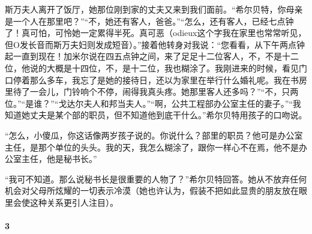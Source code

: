 \par 斯万夫人离开了饭厅，她那位刚到家的丈夫又来到我们面前。“希尔贝特，你母亲是一个人在那里吧？”“不，她还有客人，爸爸。”“怎么，还有客人，已经七点钟了！真可怕，可怜她一定累得半死。真可恶（odieux这个字我在家里也常常听见，但O发长音而斯万夫妇则发成短音）。”接着他转身对我说：“您看看，从下午两点钟起一直到现在！加米尔说在四五点钟之间，来了足足十二位客人，不，不是十二位，他说的大概是十四位，不，是十二位，我也糊涂了。我刚进来的时候，看见门口停着那么多车，我忘了是她的接待日，还以为家里在举行什么婚礼呢。我在书房里待了一会儿，门铃响个不停，闹得我真头疼。她那里客人还多吗？”“不，只两位。”“是谁？”“戈达尔夫人和邦当夫人。”“啊，公共工程部办公室主任的妻子。”“我知道她丈夫是某个部的职员，但不知道他到底干什么。”希尔贝特用孩子的口吻说。
\par “怎么，小傻瓜，你这话像两岁孩子说的。你说什么？部里的职员？他可是办公室主任，是那个单位的头头。我的天，我怎么糊涂了，跟你一样心不在焉，他不是办公室主任，他是秘书长。”
\par “我可不知道。那么说秘书长是很重要的人物了？”希尔贝特回答。她从不放弃任何机会对父母所炫耀的一切表示冷漠（她也许认为，假装不把如此显贵的朋友放在眼里会使这种关系更引人注目）。



\paragraph*{3}

